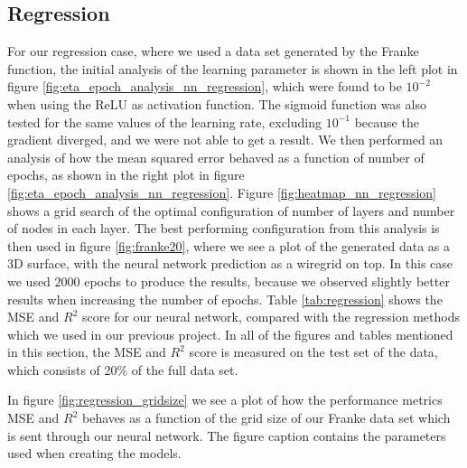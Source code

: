 \subsection{Regression}
For our regression case, where we used a data set generated by the Franke function, the initial analysis of the learning parameter is shown in the left plot in figure \ref{fig:eta_epoch_analysis_nn_regression}, which were found to be $10^{-2}$ when using the ReLU as activation function. The sigmoid function was also tested for the same values of the learning rate, excluding $10^{-1}$ because the gradient diverged, and we were not able to get a result. We then performed an analysis of how the mean squared error behaved as a function of number of epochs, as shown in the right plot in figure \ref{fig:eta_epoch_analysis_nn_regression}. Figure \ref{fig:heatmap_nn_regression} shows a grid search of the optimal configuration of number of layers and number of nodes in each layer. The best performing configuration from this analysis is then used in figure \ref{fig:franke20}, where we see a plot of the generated data as a 3D surface, with the neural network prediction as a wiregrid on top. In this case we used $2000$ epochs to produce the results, because we observed slightly better results when increasing the number of epochs. Table \ref{tab:regression} shows the MSE and $R^2$ score for our neural network, compared with the regression methods which we used in our previous project\cite{project1}. In all of the figures and tables mentioned in this section, the MSE and $R^2$ score is measured on the test set of the data, which consists of 20\% of the full data set.

In figure \ref{fig:regression_gridsize} we see a plot of how the performance metrics MSE and $R^2$ behaves as a function of the grid size of our Franke data set which is sent through our neural network. The figure caption contains the parameters used when creating the models.

